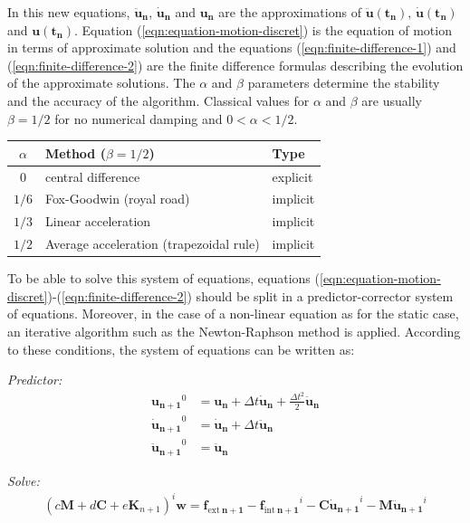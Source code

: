 \documentclass[a4paper,11pt]{book}
\renewcommand{\vec}[1]{\ensuremath{\boldsymbol{#1}}}
\newcommand{\mat}[1]{\ensuremath{\boldsymbol{#1}}}
\newcommand{\st}[1]{{\mathrm{#1}}}
\begin{document}
In this new equations, $\vec{\ddot{u}_n}$, $\vec{\dot{u}_n}$ and $\vec{u_n}$ are
the   approximations    of   $\vec{\ddot{u}(t_n)}$,   $\vec{\dot{u}(t_n)}$   and
$\vec{u(t_n)}$.  Equation (\ref{eqn:equation-motion-discret}) is the equation of
motion    in    terms    of    approximate   solution    and    the    equations
(\ref{eqn:finite-difference-1})  and   (\ref{eqn:finite-difference-2})  are  the
finite difference formulas describing the evolution of the approximate
solutions.  The $\alpha$ and $\beta$  parameters determine the stability and the
accuracy of the algorithm. Classical values for $\alpha$ and $\beta$ are usually
$\beta = 1/2$ for no numerical damping and $0 < \alpha < 1/2$.

\begin{center}
  \begin{tabular}{cll}
    \toprule
    $\alpha$ & Method ($\beta = 1/2$) & Type\\
    \midrule
    $0$ & central difference & explicit\\
    $1/6$ & Fox-Goodwin (royal road) &implicit\\
    $1/3$ & Linear acceleration &implicit\\
    $1/2$ & Average acceleration (trapezoidal rule)& implicit\\
    \bottomrule
  \end{tabular}
\end{center}

To    be    able   to    solve    this    system    of   equations,    equations
(\ref{eqn:equation-motion-discret})-(\ref{eqn:finite-difference-2})   should  be
split in a predictor-corrector system of  equations.  Moreover, in the case of a
non-linear equation as  for the static case, an iterative  algorithm such as the
Newton-Raphson method is applied.  According  to these conditions, the system of
equations can be written as:

\noindent\textit{Predictor:}
\begin{align}
  \vec{u_{n+1}}^{0} &=  \vec{u_{n}} +  \Delta t \vec{\dot{u}_n}  + \frac{\Delta
    t^2}{2} \vec{\ddot{u}_n} \\
  \vec{\dot{u}_{n+1}}^{0}  &= \vec{\dot{u}_{n}} +  \Delta t \vec{\ddot{u}_{n}} \\
  \vec{\ddot{u}_{n+1}}^{0} &= \vec{\ddot{u}_{n}}
\end{align}

\noindent\textit{Solve:}
\begin{align}
  (c \mat{M} + d \mat{C}  + e \mat{K}_{n+1})^i \vec{w} = \vec{f_{\st{ext}~n+1}} -
  \vec{f_{\st{int}~n+1}}^i    -   \mat{C}    \vec{\dot{u}_{n+1}}^i    -   \mat{M}
  \vec{\ddot{u}_{n+1}}^i
\end{align}
\end{document}
